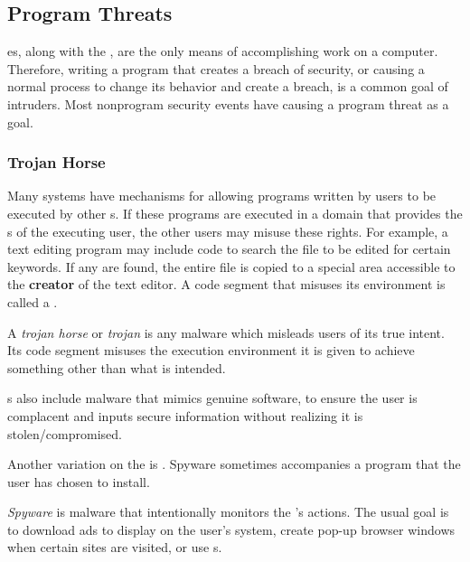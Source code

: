 \subsection{Program Threats}\label{subsec:Program_Threats}
es, along with the , are the only means of accomplishing work on a computer.
Therefore, writing a program that creates a breach of security, or causing a normal process to change its behavior and create a breach, is a common goal of intruders.
Most nonprogram security events have causing a program threat as a goal.

\subsubsection{Trojan Horse}\label{subsubsec:Trojan_Horse}
Many systems have mechanisms for allowing programs written by users to be executed by other s.
If these programs are executed in a domain that provides the s of the executing user, the other users may misuse these rights.
For example, a text editing program may include code to search the file to be edited for certain keywords.
If any are found, the entire file is copied to a special area accessible to the \textbf{creator} of the text editor.
A code segment that misuses its environment is called a .

\begin{definition}\label{def:Trojan_Horse}
  A \emph{trojan horse} or \emph{trojan} is any malware which misleads users of its true intent.
  Its code segment misuses the execution environment it is given to achieve something other than what is intended.
\end{definition}

s also include malware that mimics genuine software, to ensure the user is complacent and inputs secure information without realizing it is stolen/compromised.

Another variation on the  is .
Spyware sometimes accompanies a program that the user has chosen to install.
\begin{definition}[Spyware]\label{def:Spyware}
  \emph{Spyware} is malware that intentionally monitors the 's actions.
  The usual goal is to download ads to display on the user’s system, create pop-up browser windows when certain sites are visited, or use s.
\end{definition}

